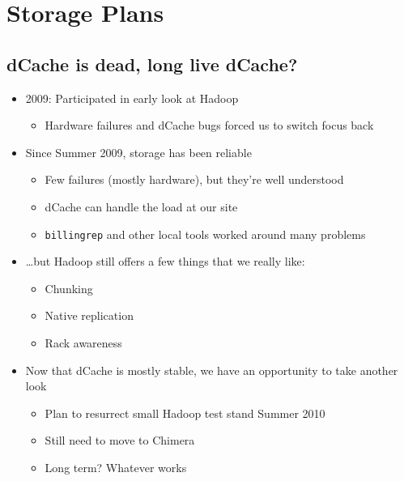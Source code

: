 \documentclass{beamer}
\begin{document}
\section{Storage Plans}
\subsection{dCache is dead, long live dCache?}
\begin{frame}
\begin{itemize}
	\item 2009: Participated in early look at Hadoop
	\begin{itemize}
		\item Hardware failures and dCache bugs forced us to switch focus back
	\end{itemize}
	\item Since Summer 2009, storage has been reliable
	\begin{itemize}
		\item Few failures (mostly hardware), but they're well understood
		\item dCache can handle the load at our site
		\item {\tt billingrep} and other local tools worked around many problems
	\end{itemize}
	\item \ldots{}but Hadoop still offers a few things that we really like:
	\begin{itemize}
		\item Chunking
		\item Native replication
		\item Rack awareness
	\end{itemize}
	\item Now that dCache is mostly stable, we have an opportunity to take another look 
	\begin{itemize}
		\item Plan to resurrect small Hadoop test stand Summer 2010
		\item Still need to move to Chimera
		\item Long term? Whatever works
	\end{itemize}
\end{itemize}
\end{frame}
\end{document}
